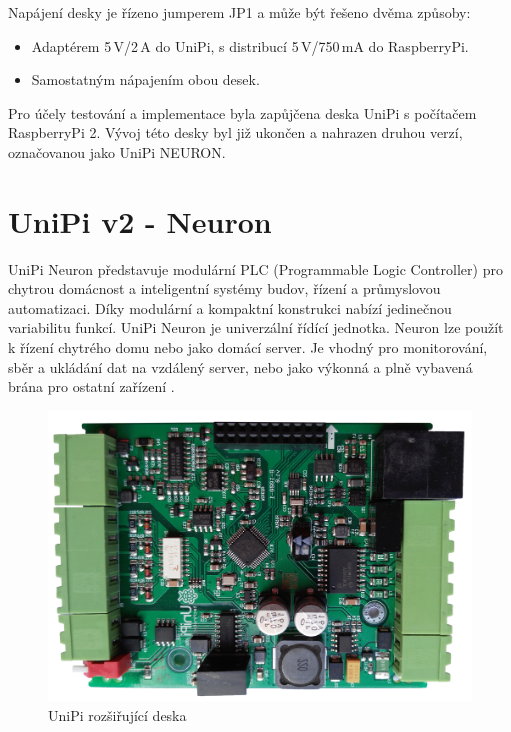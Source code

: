 Napájení desky je řízeno jumperem JP1 a může být řešeno dvěma způsoby:
\begin{itemize}
	\item Adaptérem 5\,V/2\,A do UniPi, s distribucí 5\,V/750\,mA do RaspberryPi.
	\item Samostatným nápajením obou desek.
\end{itemize}

\vspace{10pt}
Pro účely testování a implementace byla zapůjčena deska UniPi s počítačem RaspberryPi 2. Vývoj této desky byl již ukončen a nahrazen druhou verzí, označovanou jako UniPi NEURON.




\section{UniPi v2 - Neuron}
\label{KapitolaUnipi2}

UniPi Neuron představuje modulární PLC (Programmable Logic Controller) pro chytrou domácnost a inteligentní systémy budov, řízení a průmyslovou automatizaci. Díky modulární a kompaktní konstrukci nabízí jedinečnou variabilitu funkcí. UniPi Neuron je univerzální řídící jednotka. Neuron lze použít k řízení chytrého domu nebo jako domácí server. Je vhodný pro monitorování, sběr a ukládání dat na vzdálený server, nebo jako výkonná a plně vybavená brána pro ostatní zařízení \cite{UniPiBoard2}.

 \begin{figure}[!ht]
  \vspace{-10pt}
  \begin{center}
    \includegraphics[scale=0.25]{obrazky/unipi_unipi_deska}
  \end{center}
	\vspace{-20pt}
  \caption{UniPi rozšiřující deska}
	\label{UnipiV2DeskaUnipi}
	\vspace{-10pt}
\end{figure}

